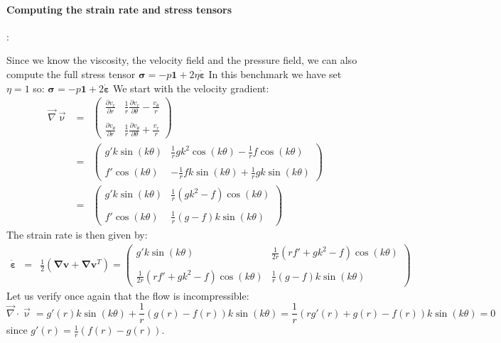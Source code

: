 \paragraph{Computing the strain rate and stress tensors}:

Since we know the viscosity, the velocity field and the pressure field, 
we can also compute the full stress tensor 
${\bm \sigma} = - p {\bm 1} + 2 \eta \dot{\bm \varepsilon}$
In this benchmark we have set $\eta=1$ so:
$
{\bm \sigma} = - p {\bm 1} + 2 \dot{\bm \varepsilon}
$
We start with the velocity gradient:
\begin{eqnarray}
{\vec \nabla}{\vec \upnu}
&=&
\left(
\begin{array}{cc}
\frac{\partial v_r}{\partial r}    &  \frac{1}{r}\frac{\partial v_r}{\partial \theta}-\frac{v_\theta}{r} \\ \\
\frac{\partial v_\theta}{\partial r} &  \frac{1}{r}\frac{\partial v_\theta}{\partial \theta}+\frac{v_r}{r}
\end{array}
\right) \nonumber\\
&=&
\left(
\begin{array}{cc}
g' k \sin(k\theta)  &  \frac{1}{r} g k^2 \cos(k\theta)  -\frac{1}{r} f \cos(k\theta) \\ \\
f' \cos (k\theta)   &  -\frac{1}{r} f k \sin(k\theta)   +\frac{1}{r} g k \sin(k\theta)
\end{array}
\right) \nonumber\\
&=&
\left(
\begin{array}{cc}
g' k \sin(k\theta)  &  \frac{1}{r} (g k^2 - f) \cos(k\theta) \\ \\
f' \cos (k\theta)   &  \frac{1}{r} ( g-f ) k  \sin(k\theta)
\end{array}
\right) 
\end{eqnarray}
The strain rate is then given by:
\begin{eqnarray}
\dot{\bm \varepsilon} &=&
\frac{1}{2} ( {\bm \nabla}{\bm v} + {\bm \nabla}{\bm v}^T) 
=
\left(
\begin{array}{cc}
g' k \sin(k\theta)  &  \frac{1}{2r} (rf' + g k^2 - f) \cos(k\theta) \\ \\
\frac{1}{2r} (rf' + g k^2 - f) \cos(k\theta)    &  \frac{1}{r} ( g-f ) k  \sin(k\theta)
\end{array}
\right) 
\end{eqnarray}
Let us verify once again that the flow is incompressible:
\[
{\vec \nabla}\cdot{\vec \upnu} 
= g'(r) k \sin(k\theta)  + \frac{1}{r} ( g(r)-f(r) ) k  \sin(k\theta)
= \frac{1}{r} ( r g'(r) + g(r)-f(r) ) k  \sin(k\theta)
=0
\]
since $g'(r)= \frac{1}{r}(f(r)-g(r))$.

